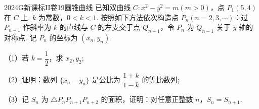 
\begin{problem}{2024}{G}{新课标II卷}{19}{圆锥曲线}
已知双曲线 $C: x^2-y^2=m(m>0)$，点 $P_1(5,4)$ 在 $C$ 上. $k$ 为常数，$0<k<1$. 按照如下方法依次构造点 $P_n(n=2,3,\cdots)$：过 $P_{n-1}$ 作斜率为 $k$ 的直线与 $C$ 的左支交于点 $Q_{n-1}$，令 $P_n$ 为 $Q_{n-1}$ 关于 $y$ 轴的对称点. 记 $P_n$ 的坐标为 $(x_n, y_n)$.

（1）若 $k=\dfrac{1}{2}$，求 $x_2, y_2$;

（2）证明：数列 $\{x_n-y_n\}$ 是公比为 $\dfrac{1+k}{1-k}$ 的等比数列;

（3）记 $S_n$ 为 $\triangle P_n P_{n+1} P_{n+2}$ 的面积，证明：对任意正整数 $n$，$S_n=S_{n+1}$.
\end{problem}

